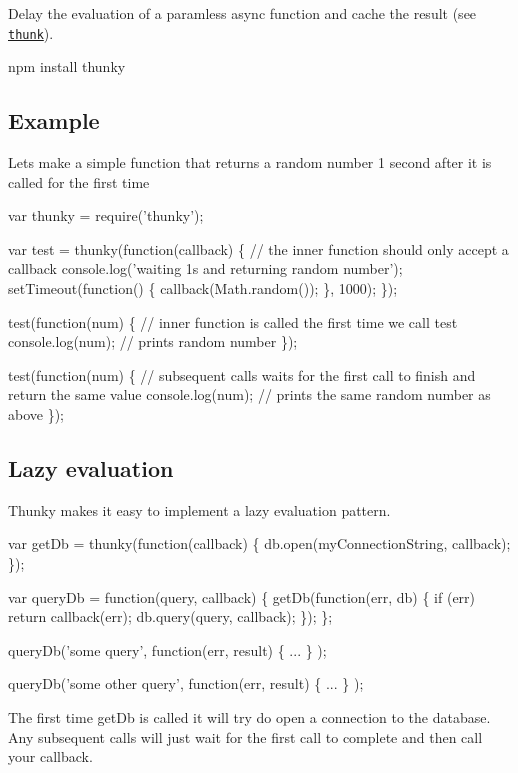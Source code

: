 Delay the evaluation of a paramless async function and cache the result (see \href{http://en.wikipedia.org/wiki/Thunk_%28functional_programming%29}{\tt thunk}). \begin{DoxyVerb}npm install thunky
\end{DoxyVerb}


\subsection*{Example}

Let\textquotesingle{}s make a simple function that returns a random number 1 second after it is called for the first time


\begin{DoxyCode}
var thunky = require('thunky');

var test = thunky(function(callback) \{ // the inner function should only accept a callback
    console.log('waiting 1s and returning random number');
    setTimeout(function() \{
        callback(Math.random());
    \}, 1000);
\});

test(function(num) \{  // inner function is called the first time we call test
    console.log(num); // prints random number
\});

test(function(num) \{  // subsequent calls waits for the first call to finish and return the same value
    console.log(num); // prints the same random number as above
\});
\end{DoxyCode}


\subsection*{Lazy evaluation}

Thunky makes it easy to implement a lazy evaluation pattern.


\begin{DoxyCode}
var getDb = thunky(function(callback) \{
    db.open(myConnectionString, callback);
\});

var queryDb = function(query, callback) \{
    getDb(function(err, db) \{
        if (err) return callback(err);
        db.query(query, callback);
    \});
\};

queryDb('some query', function(err, result) \{ ... \} );

queryDb('some other query', function(err, result) \{ ... \} );
\end{DoxyCode}


The first time {\ttfamily get\+Db} is called it will try do open a connection to the database. Any subsequent calls will just wait for the first call to complete and then call your callback.

